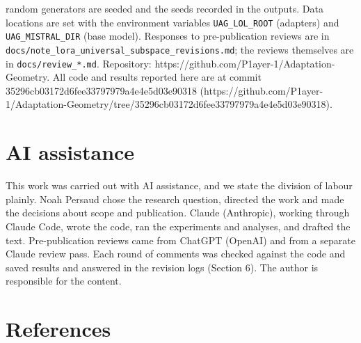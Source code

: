 \documentclass[
  11pt,
]{article}
\begin{document}
random generators are seeded and the seeds recorded in the outputs. Data
locations are set with the environment variables \texttt{UAG\_\allowbreak{}LOL\_\allowbreak{}ROOT}
(adapters) and \texttt{UAG\_\allowbreak{}MISTRAL\_\allowbreak{}DIR} (base model). Responses to
pre-publication reviews are in
\texttt{docs/\allowbreak{}note\_\allowbreak{}lora\_\allowbreak{}universal\_\allowbreak{}subspace\_\allowbreak{}revisions.md}; the reviews
themselves are in \texttt{docs/\allowbreak{}review\_\allowbreak{}*.md}. Repository:
https://github.com/P1ayer-1/Adaptation-Geometry. All code and results
reported here are at commit 35296cb03172d6fee33797979a4e4e5d03e90318
(https://github.com/P1ayer-1/Adaptation-Geometry/tree/35296cb03172d6fee33797979a4e4e5d03e90318).

\section{AI assistance}\label{ai-assistance}

This work was carried out with AI assistance, and we state the division
of labour plainly. Noah Persaud chose the research question, directed
the work and made the decisions about scope and publication. Claude
(Anthropic), working through Claude Code, wrote the code, ran the
experiments and analyses, and drafted the text. Pre-publication reviews
came from ChatGPT (OpenAI) and from a separate Claude review pass. Each
round of comments was checked against the code and saved results and
answered in the revision logs (Section 6). The author is responsible for
the content.

\section{References}\label{references}
\end{document}
